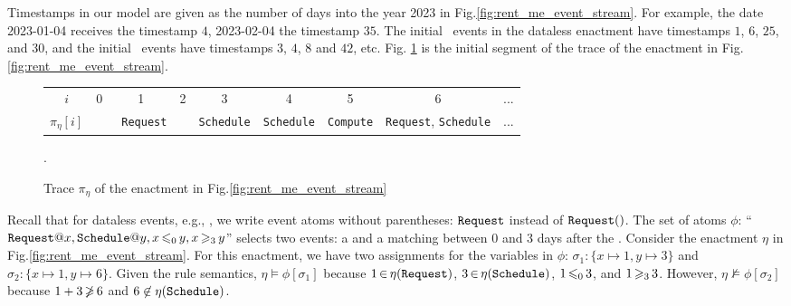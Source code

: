 \begin{examp}\label{ex:dataless-RentMe}
  Timestamps in our model are given as the number of days into the year 2023
  in Fig.\:\ref{fig:rent_me_event_stream}.
  For example, the date 2023-01-04 receives the timestamp $4$,
  2023-02-04 the timestamp $35$.
  The initial \Request\ events
  in the dataless enactment have timestamps $1$, $6$, $25$, and $30$,
  and
  the initial \Schedule\ events
  have timestamps $3$, $4$, $8$ and $42$, etc.
Fig. \ref{fig:example-trace} is the initial segment of the trace
of the enactment in Fig.\:\ref{fig:rent_me_event_stream}.
\end{examp}

\begin{figure}\centering
  \hspace*{1mm}
  \begin{tabular}{c|c|@{\,}c@{\,}|c|@{\,}c@{\,}|@{\,}c@{\,}|@{\,}c@{\,}|@{\,}c@{\,}|c|}
  \cline{2-9}
  $i$ & 0 & 1 & 2 & 3 & 4     & 5 & 6 & ... \\ \cline{2-9} 
  $\pi_\eta[i]$ 
          &
          & \texttt{\,Request}
          &
          & \texttt{Schedule}
          & \texttt{Schedule}
          & \texttt{Compute}
          & \texttt{Request}, \texttt{Schedule}
          & ... \\ \cline{2-9} 
  \end{tabular}
      \caption{Trace $\pi_\eta$ of the enactment in Fig.\:\ref{fig:rent_me_event_stream}}.
      \label{fig:example-trace}
  \end{figure}
  
\begin{examp}
  Recall that for dataless events, e.g., {\Request},
  we write event atoms without parentheses: $\texttt{Request}$ instead of $\texttt{Request}()$.
  The set of atoms
  $\phi$: 
  ``$\Request@x, \allowbreak \Schedule@y, x\tight{\leq_0} y, x\tight{\geq_3} y$''
  selects two events:
  a {\Request} and a matching {\Schedule} between 0 and 3 days after the {\Request}.
  Consider the enactment $\eta$ in Fig.\:\ref{fig:rent_me_event_stream}.
  For this enactment,
  we have
  two assignments for the variables in $\phi$:
  $\sigma_1:\{x \mapsto 1, y\mapsto 3\}$ and $\sigma_2:\{x\mapsto 1,y\mapsto 6\}$.
  Given the rule semantics,
  $\eta\models\phi[\sigma_1]$
  because $1 \,{\in}\, \eta(\texttt{Request})$,
  $3 \,{\in}\, \eta(\texttt{Schedule})$,
  $1 \,{\leqslant_0}\, 3$, and $1 \,{\geqslant_3}\, 3$.
  However,
  $\eta\not\models\phi[\sigma_2]$
  because $1+3 \,{\not\geqslant}\, 6$
  and $6\not\in\eta(\texttt{Schedule})$.
\end{examp}
  
